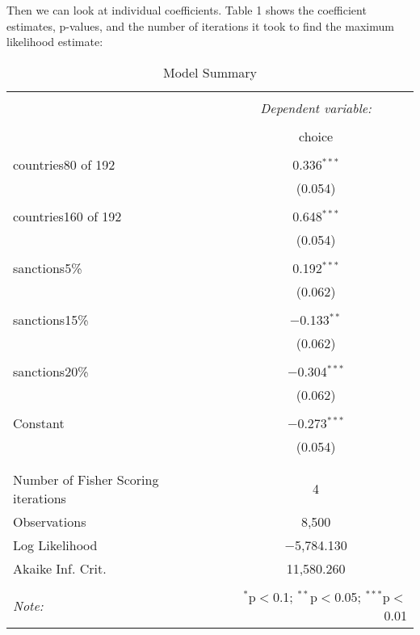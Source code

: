 \documentclass[12pt,letterpaper]{article}
\begin{document}
\begin{enumerate}
	\noindent Then we can look at individual coefficients. Table 1 shows the coefficient estimates, p-values, and the number of iterations it took to find the maximum likelihood estimate: 
	
		\begin{table}[!htbp] \centering   \caption{Model Summary}   \label{} \begin{tabular}{@{\extracolsep{5pt}}lc} \\[-1.8ex]\hline \hline \\[-1.8ex]  & \multicolumn{1}{c}{\textit{Dependent variable:}} \\ \cline{2-2} \\[-1.8ex] & choice \\ \hline \\[-1.8ex]  countries80 of 192 & 0.336$^{***}$ \\   & (0.054) \\   & \\  countries160 of 192 & 0.648$^{***}$ \\   & (0.054) \\   & \\  sanctions5\% & 0.192$^{***}$ \\   & (0.062) \\   & \\  sanctions15\% & $-$0.133$^{**}$ \\   & (0.062) \\   & \\  sanctions20\% & $-$0.304$^{***}$ \\   & (0.062) \\   & \\  Constant & $-$0.273$^{***}$ \\   & (0.054) \\   & \\ \hline \\[-1.8ex] Number of Fisher Scoring iterations & 4 \\ Observations & 8,500 \\ Log Likelihood & $-$5,784.130 \\ Akaike Inf. Crit. & 11,580.260 \\ \hline \hline \\[-1.8ex] \textit{Note:}  & \multicolumn{1}{r}{$^{*}$p$<$0.1; $^{**}$p$<$0.05; $^{***}$p$<$0.01} \\ \end{tabular} \end{table} 
		

\end{enumerate}
\end{document}
